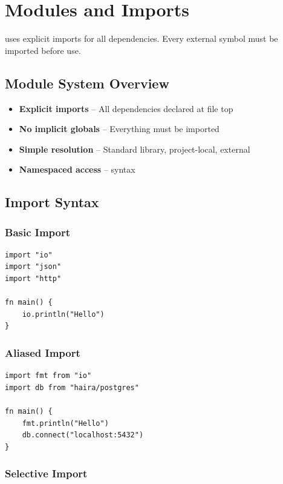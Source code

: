 \chapter{Modules and Imports}
\label{ch:modules}

\haira{} uses explicit imports for all dependencies. Every external symbol must be imported before use.

\section{Module System Overview}

\begin{itemize}
    \item \textbf{Explicit imports} -- All dependencies declared at file top
    \item \textbf{No implicit globals} -- Everything must be imported
    \item \textbf{Simple resolution} -- Standard library, project-local, external
    \item \textbf{Namespaced access} --  syntax
\end{itemize}

\section{Import Syntax}

\subsection{Basic Import}

\begin{lstlisting}
import "io"
import "json"
import "http"

fn main() {
    io.println("Hello")
}
\end{lstlisting}

\subsection{Aliased Import}

\begin{lstlisting}
import fmt from "io"
import db from "haira/postgres"

fn main() {
    fmt.println("Hello")
    db.connect("localhost:5432")
}
\end{lstlisting}

\subsection{Selective Import}

